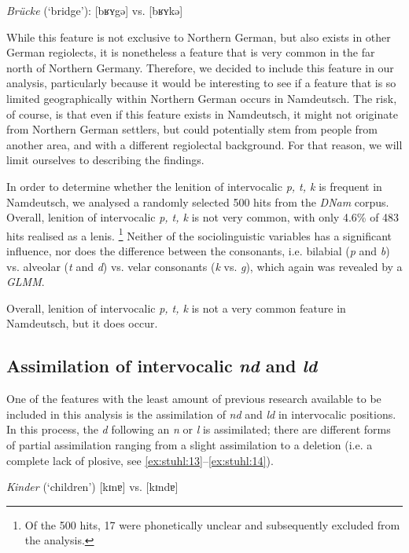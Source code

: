 \documentclass[output=paper]{langsci/langscibook}
\begin{document}
\ea
\label{ex:stuhl:12}    
{\textit{Brücke}} (‘bridge’): {[bʁʏgə]} vs. {[bʁʏkə]}
\z 
 

While this feature is not exclusive to Northern German, but also exists in other German regiolects, it is nonetheless a feature that is very common in the far north of Northern Germany. Therefore, we decided to include this feature in our analysis, particularly because it would be interesting to see if a feature that is so limited geographically within Northern German occurs in Namdeutsch. The risk, of course, is that even if this feature exists in Namdeutsch, it might not originate from Northern German settlers, but could potentially stem from people from another area, and with a different regiolectal background. For that reason, we will limit ourselves to describing the findings.

In order to determine whether the lenition of intervocalic \textit{p, t, k} is frequent in Namdeutsch, we analysed a randomly selected 500 hits from the \textit{DNam} corpus. Overall, lenition of intervocalic \textit{p, t, k} is not very common, with only 4.6\% of 483 hits realised as a lenis.{} \footnote{Of the 500 hits, 17 were phonetically unclear and subsequently excluded from the analysis.} Neither of the sociolinguistic variables has a significant influence, nor does the difference between the consonants, i.e. bilabial (\textit{p} and \textit{b}) vs. alveolar (\textit{t} and \textit{d}) vs. velar consonants (\textit{k} vs. \textit{g}), which again was revealed by a \textit{GLMM}. 

Overall, lenition of intervocalic \textit{p, t, k} is not a very common feature in Namdeutsch, but it does occur. 

\subsection{Assimilation of intervocalic \textit{nd} and \textit{ld}}
\label{sec:stuhl:4.6}

One of the features with the least amount of previous research available to be included in this analysis is the assimilation of \textit{nd} and \textit{ld} in intervocalic positions. In this process, the \textit{d} following an \textit{n} or \textit{l} is assimilated; there are different forms of partial assimilation ranging from a slight assimilation to a deletion (i.e. a complete lack of plosive, see \ref{ex:stuhl:13}--\ref{ex:stuhl:14}).

 
\ea
\label{ex:stuhl:13}  
\textit{Kinder} (‘children’) {[kɪnɐ]} vs. {[kɪndɐ]}
\z
\end{document}
